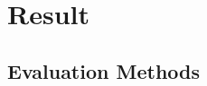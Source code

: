 \documentclass{ieeeojies}
\begin{document}
	
	\section{Result}
	\subsection{Evaluation Methods}
\end{document}
